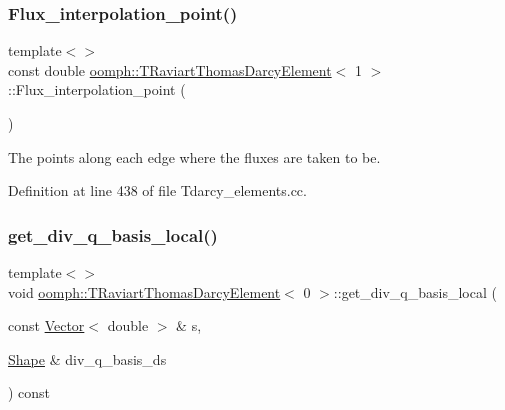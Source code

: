 \subsubsection{\texorpdfstring{Flux\+\_\+interpolation\+\_\+point()}{Flux\_interpolation\_point()}\hspace{0.1cm}{\footnotesize\ttfamily [2/2]}}
{\footnotesize\ttfamily template$<$$>$ \\
const double \hyperlink{classoomph_1_1TRaviartThomasDarcyElement}{oomph\+::\+T\+Raviart\+Thomas\+Darcy\+Element}$<$ 1 $>$\+::Flux\+\_\+interpolation\+\_\+point (\begin{DoxyParamCaption}{ }\end{DoxyParamCaption})\hspace{0.3cm}{\ttfamily [private]}}



The points along each edge where the fluxes are taken to be. 



Definition at line 438 of file Tdarcy\+\_\+elements.\+cc.

\mbox{\label{classoomph_1_1TRaviartThomasDarcyElement_a1fd04fa65b0925c6d23b37c1e04a80cb}} 
\subsubsection{\texorpdfstring{get\+\_\+div\+\_\+q\+\_\+basis\+\_\+local()}{get\_div\_q\_basis\_local()}\hspace{0.1cm}{\footnotesize\ttfamily [1/3]}}
{\footnotesize\ttfamily template$<$$>$ \\
void \hyperlink{classoomph_1_1TRaviartThomasDarcyElement}{oomph\+::\+T\+Raviart\+Thomas\+Darcy\+Element}$<$ 0 $>$\+::get\+\_\+div\+\_\+q\+\_\+basis\+\_\+local (\begin{DoxyParamCaption}\item[{const \hyperlink{classoomph_1_1Vector}{Vector}$<$ double $>$ \&}]{s,  }\item[{\hyperlink{classoomph_1_1Shape}{Shape} \&}]{div\+\_\+q\+\_\+basis\+\_\+ds }\end{DoxyParamCaption}) const\hspace{0.3cm}{\ttfamily [virtual]}}



